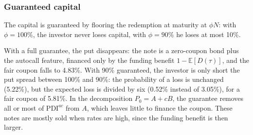 \documentclass[11pt,a4paper]{article}
\newcommand{\E}{\mathbb{E}}
\begin{document}
\clearpage
\subsubsection{Guaranteed capital}

The capital is guaranteed by flooring the redemption at maturity at $\phi N$: with $\phi = 100\%$, the investor never
loses capital, with $\phi = 90\%$ he loses at most 10\%.

\begin{table}[htbp]
  \centering
  \small
  \caption{Capital guarantee: the redemption at maturity is floored at 90\% or 100\% of the nominal.}
  \label{tab:athena-guaranteed}
\end{table}

With a full guarantee, the put disappears: the note is a zero-coupon bond plus the autocall feature, financed only
by the funding benefit $1 - \E[D(\tau)]$, and the fair coupon falls to 4.83\%. With 90\% guaranteed, the investor
is only short the put spread between 100\% and 90\%: the probability of a loss is unchanged (5.22\%), but the
expected loss is divided by six (0.52\% instead of 3.05\%), for a fair coupon of 5.81\%. In the decomposition
$P_0 = A + cB$, the guarantee removes all or most of $\mathrm{PDI}^{ac}$ from $A$, which leaves little to finance
the coupon. These notes are mostly sold when rates are high, since the funding benefit is then larger.
\end{document}
